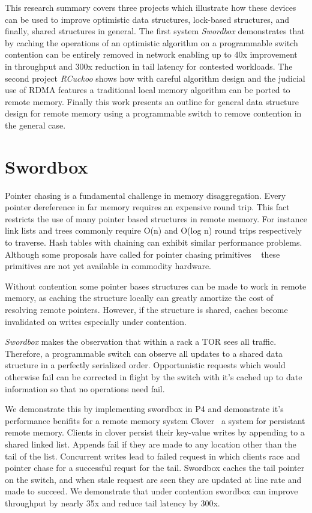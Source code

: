 This research summary covers three projects which illustrate
how these devices can be used to improve optimistic data
structures, lock-based structures, and finally, shared
structures in general.  The first system \textit{Swordbox}
demonstrates that by caching the operations of an optimistic
algorithm on a programmable switch contention can be
entirely removed in network enabling up to 40x improvement
in throughput and 300x reduction in tail latency for
contested workloads. The second project \textit{RCuckoo}
shows how with careful algorithm design and the judicial use
of RDMA features a traditional local memory algorithm can be
ported to remote memory. Finally this work presents an
outline for general data structure design for remote memory
using a programmable switch to remove contention in the
general case.


\section{Swordbox}

Pointer chasing is a fundamental challenge in memory
disaggregation. Every pointer dereference in far memory
requires an expensive round trip. This fact restricts the
use of many pointer based structures in remote memory. For
instance link lists and trees commonly require O(n) and
O(log n) round trips respectively to traverse. Hash tables
with chaining can exhibit similar performance problems.
Although some proposals have called for pointer chasing
primitives ~\cite{supernic, prism} these primitives are not
yet available in commodity hardware.

Without contention some pointer bases structures can be made
to work in remote memory, as caching the structure locally
can greatly amortize the cost of resolving remote pointers.
However, if the structure is shared, caches become
invalidated on writes especially under contention.

\textit{Swordbox} makes the observation that within a rack a
TOR sees all traffic. Therefore, a programmable switch can
observe all updates to a shared data structure in a
perfectly serialized order. Opportunistic requests which
would otherwise fail can be corrected in flight by the
switch with it's cached up to date information so that no
operations need fail.

We demonstrate this by implementing swordbox in P4 and
demonstrate it's performance benifits for a remote memory
system Clover~\cite{clover} a system for persistant remote
memory. Clients in clover persist their key-value writes by
appending to a shared linked list. Appends fail if they are
made to any location other than the tail of the list.
Concurrent writes lead to failed request in which clients
race and pointer chase for a successful requst for the tail.
Swordbox caches the tail pointer on the switch, and when
stale request are seen they are updated at line rate and
made to succeed.  We demonstrate that under contention
swordbox can improve throughput by nearly 35x and reduce
tail latency by 300x. 

